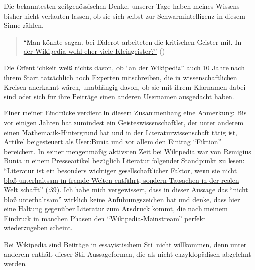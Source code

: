 \documentclass[fontsize=12pt]{scrartcl}
\begin{document}
Die bekanntesten zeitgen\"ossischen Denker\textsuperscript{\tiny *} unserer Tage haben meines Wissens bis\-her nicht verlauten lassen, ob sie sich \mbox{selbst} zur Schwarmintelligenz in diesem Sinne z\"ahlen. 

\singlespacing
\begin{quote}
\href{https://de.wikipedia.org/w/index.php?title=Benutzer_Diskussion:Simplicius\&diff=next\&oldid=136226937}{"`Man k\"onnte sagen, bei Diderot arbeiteten die kritischen Geister mit. In der Wi\-ki\-pe\-dia wohl eher viele Kleingeister?"'} (\cite{UserSimplicius2014a}) 
\end{quote} 
\onehalfspacing

Die \"Of\-fent\-lichkeit wei{\ss} nichts davon, ob "`an der Wi\-ki\-pe\-dia"' auch 10 Jahre nach ihrem Start tats\"achlich noch Experten\textsuperscript{\tiny *} mitschrei\-ben, die in wissenschaftlichen Kreisen anerkannt w\"aren, unabh\"angig davon, ob sie mit ihrem Klarnamen dabei sind oder sich f\"ur ihre Beitr\"age einen anderen Usernamen ausgedacht haben. 

Einer meiner Eindr\"ucke verdient in diesem Zusammenhang eine Anmerkung: Bis vor einigen Jahren hat zumindest ein Geisteswissenschaftler\textsuperscript{\tiny *}, der unter anderem einen Mathematik-Hintergrund hat und in der Li\-te\-ra\-tur\-wissenschaft t\"atig ist, Artikel beigesteuert als \mbox{User}:Bunia und vor allem den Eintrag "`Fiktion"' bereichert. In seiner mengenm\"a{\ss}ig aktivsten Zeit bei Wi\-ki\-pe\-dia war von Remigius Bunia in einem Presseartikel bez\"uglich Li\-te\-ra\-tur folgender Standpunkt zu lesen: \href{http://litwiss.bunia.de/folders/litwiss/bunia_esra.pdf}{"`Li\-te\-ra\-tur ist ein besonders wichtiger ge\-sell\-schaftlicher Faktor, wenn sie nicht blo{\ss} unterhaltsam in \flq fremde Welten\frq \,\,entf\"uhrt, sondern Tatsachen in der realen Welt schafft"'} (\cite{Bunia2007}:39). Ich habe mich vergewissert, dass in dieser Aussage das "`nicht blo{\ss} unterhaltsam"' wirklich keine Anf\"uh\-rungszeichen hat und denke, dass \mbox{hier} eine Haltung gegen\"uber Li\-te\-ra\-tur zum Ausdruck kommt, die nach meinem Eindruck in manchen Phasen den "`Wi\-ki\-pe\-dia-Mainstream"' perfekt wiederzugeben scheint.

Bei Wi\-ki\-pe\-dia sind Beitr\"age in essayistischem Stil nicht willkommen, denn unter anderem enth\"alt dieser Stil Aussageformen, die als nicht enzyklop\"adisch abgelehnt werden.
\end{document}
